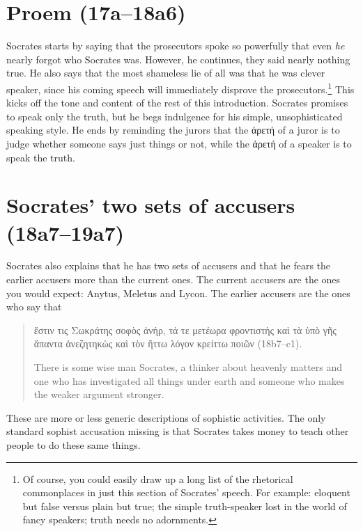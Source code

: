 \documentclass[11pt]{article}
\begin{document}

\section{Proem (17a--18a6)}

Socrates starts by saying that the prosecutors spoke so powerfully that even \emph{he} nearly forgot who Socrates was.  However, he continues, they said nearly nothing true.   He also says that the most shameless lie of all was that he was clever speaker, since his coming speech will immediately disprove the prosecutors.\footnote{Of course, you could easily draw up a long list of the rhetorical commonplaces in just this section of Socrates' speech.  For example: eloquent but false versus plain but true; the simple truth-speaker lost in the world of fancy speakers; truth needs no adornments.}  This kicks off the tone and content of the rest of this introduction.  Socrates promises to speak only the truth, but he begs indulgence for his simple, unsophisticated speaking style.  He ends by reminding the jurors that the ἀρετή of a juror is to judge whether someone says just things or not, while the ἀρετή of a speaker is to speak the truth.

\section{Socrates' two sets of accusers (18a7--19a7)}

Socrates also explains that he has two sets of accusers and that he fears the earlier accusers more than the current ones.  The current accusers are the ones you would expect: Anytus, Meletus and Lycon.  The earlier accusers are the ones who say that

\begin{quote}
    ἔστιν τις Σωκράτης σοφὸς ἀνήρ, τά τε μετέωρα φροντιστὴς καὶ τὰ ὑπὸ γῆς ἅπαντα ἀνεζητηκὼς καὶ τὸν ἥττω λόγον κρείττω ποιῶν (18b7--c1).

    There is some wise man Socrates, a thinker about heavenly matters and one who has investigated all things under earth and someone who makes the weaker argument stronger.
\end{quote}

These are more or less generic descriptions of sophistic activities.  The only standard sophist accusation missing is that Socrates takes money to teach other people to do these same things.
\end{document}
